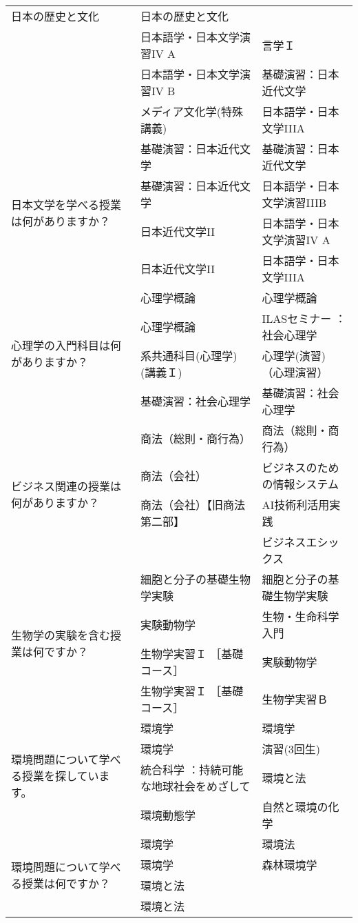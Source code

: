\begin{table}[htbp]
{\begin{tabular}{|p{2.5cm}|p{5.5cm}|p{5.5cm}|}
        日本の歴史と文化 & 日本の歴史と文化 \\
        & 日本語学・日本文学演習IV A & 言学Ｉ \\
        & 日本語学・日本文学演習IV B & 基礎演習：日本近代文学 \\
        & メディア文化学(特殊講義) & 日本語学・日本文学IIIA \\ \hline
        \multirow{4}{2.5cm}{日本文学を学べる授業は何がありますか？} & 
        基礎演習：日本近代文学 & 基礎演習：日本近代文学 \\
        & 基礎演習：日本近代文学 & 日本語学・日本文学演習IIIB \\
        & 日本近代文学II & 日本語学・日本文学演習IV A \\
        & 日本近代文学II & 日本語学・日本文学IIIA \\ \hline
        \multirow{4}{2.5cm}{心理学の入門科目は何がありますか？} & 
        心理学概論 & 心理学概論 \\
        & 心理学概論 & ILASセミナー ：社会心理学 \\
        & 系共通科目(心理学)(講義Ｉ) & 心理学(演習)（心理演習） \\
        & 基礎演習：社会心理学 & 基礎演習：社会心理学 \\ \hline
        \multirow{4}{2.5cm}{ビジネス関連の授業は何がありますか？} & 
        商法（総則・商行為） & 商法（総則・商行為） \\
        & 商法（会社） & ビジネスのための情報システム \\
        & 商法（会社）【旧商法第二部】 & AI技術利活用実践 \\
        &  & ビジネスエシックス \\ \hline
        \multirow{4}{2.5cm}{生物学の実験を含む授業は何ですか？} & 
        細胞と分子の基礎生物学実験 & 細胞と分子の基礎生物学実験 \\
        & 実験動物学 & 生物・生命科学入門 \\
        & 生物学実習Ｉ ［基礎コース］ & 実験動物学 \\
        & 生物学実習Ｉ ［基礎コース］ & 生物学実習Ｂ \\ \hline
        \multirow{4}{2.5cm}{環境問題について学べる授業を探しています。} & 
        環境学 & 環境学 \\
        & 環境学 & 演習(3回生) \\
        & 統合科学 ：持続可能な地球社会をめざして & 環境と法 \\
        & 環境動態学 & 自然と環境の化学 \\ \hline
        \multirow{4}{2.5cm}{環境問題について学べる授業は何ですか？} & 
        環境学 & 環境法 \\
        & 環境学 & 森林環境学 \\
        & 環境と法 & \\
        & 環境と法 & \\ \hline
    \end{tabular}
    }
\end{table}


